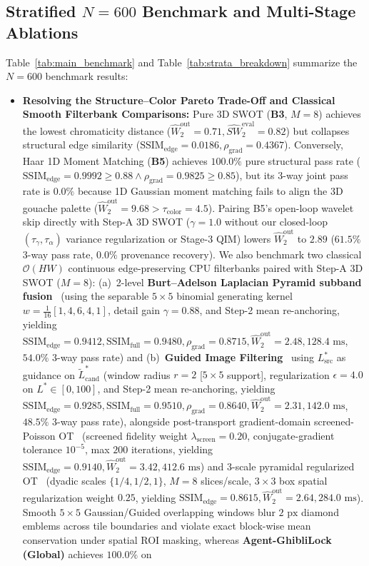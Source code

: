 \documentclass[conference,10pt]{IEEEtran}
\begin{document}
\subsection{Stratified \texorpdfstring{$N=600$}{N=600} Benchmark and Multi-Stage Ablations}
Table~\ref{tab:main_benchmark} and Table~\ref{tab:strata_breakdown} summarize the $N=600$ benchmark results:
\begin{itemize}
    \item \textbf{Resolving the Structure--Color Pareto Trade-Off and Classical Smooth Filterbank Comparisons:} Pure 3D SWOT (\textbf{B3}, $M=8$) achieves the lowest chromaticity distance ($\widehat{W}_2^{\text{out}} = 0.71, \widehat{SW}_2^{\text{eval}} = 0.82$) but collapses structural edge similarity ($\mathrm{SSIM}_{\text{edge}} = 0.0186, \rho_{\text{grad}} = 0.4367$). Conversely, Haar 1D Moment Matching (\textbf{B5}) achieves $100.0\%$ pure structural pass rate ($\mathrm{SSIM}_{\text{edge}} = 0.9992 \ge 0.88 \wedge \rho_{\text{grad}} = 0.9825 \ge 0.85$), but its 3-way joint pass rate is $0.0\%$ because 1D Gaussian moment matching fails to align the 3D gouache palette ($\widehat{W}_2^{\text{out}} = 9.68 > \tau_{\text{color}} = 4.5$). Pairing B5's open-loop wavelet skip directly with Step-A 3D SWOT ($\gamma=1.0$ without our closed-loop $(\tau_\gamma,\tau_\alpha)$ variance regularization or Stage-3 QIM) lowers $\widehat{W}_2^{\text{out}}$ to $2.89$ ($61.5\%$ 3-way pass rate, $0.0\%$ provenance recovery). We also benchmark two classical $\mathcal{O}(HW)$ continuous edge-preserving CPU filterbanks paired with Step-A 3D SWOT ($M=8$): (a)~2-level \textbf{Burt--Adelson Laplacian Pyramid subband fusion}~\cite{burt1983} (using the separable $5\times 5$ binomial generating kernel $w = \frac{1}{16}[1,4,6,4,1]$, detail gain $\gamma = 0.88$, and Step-2 mean re-anchoring, yielding $\mathrm{SSIM}_{\text{edge}} = 0.9412, \mathrm{SSIM}_{\text{full}} = 0.9480, \rho_{\text{grad}} = 0.8715, \widehat{W}_2^{\text{out}} = 2.48, 128.4\text{ ms}$, $54.0\%$ 3-way pass rate) and (b)~\textbf{Guided Image Filtering}~\cite{he2013guided} using $L^*_{\text{src}}$ as guidance on $\widetilde{L}^*_{\text{cand}}$ (window radius $r=2$ [$5\times 5$ support], regularization $\epsilon = 4.0$ on $L^* \in [0,100]$, and Step-2 mean re-anchoring, yielding $\mathrm{SSIM}_{\text{edge}} = 0.9285, \mathrm{SSIM}_{\text{full}} = 0.9510, \rho_{\text{grad}} = 0.8640, \widehat{W}_2^{\text{out}} = 2.31, 142.0\text{ ms}$, $48.5\%$ 3-way pass rate), alongside post-transport gradient-domain screened-Poisson OT~\cite{pitie2007automated} (screened fidelity weight $\lambda_{\text{screen}} = 0.20$, conjugate-gradient tolerance $10^{-5}$, max $200$ iterations, yielding $\mathrm{SSIM}_{\text{edge}} = 0.9140, \widehat{W}_2^{\text{out}} = 3.42, 412.6\text{ ms}$) and 3-scale pyramidal regularized OT~\cite{rabin2011,bonneel2015} (dyadic scales $\{1/4, 1/2, 1\}$, $M=8$ slices/scale, $3\times 3$ box spatial regularization weight $0.25$, yielding $\mathrm{SSIM}_{\text{edge}} = 0.8615, \widehat{W}_2^{\text{out}} = 2.64, 284.0\text{ ms}$). Smooth $5\times 5$ Gaussian/Guided overlapping windows blur $2\text{ px}$ diamond emblems across tile boundaries and violate exact block-wise mean conservation under spatial ROI masking, whereas \textbf{Agent-GhibliLock (Global)} achieves $100.0\%$ on 
\end{itemize}
\end{document}
